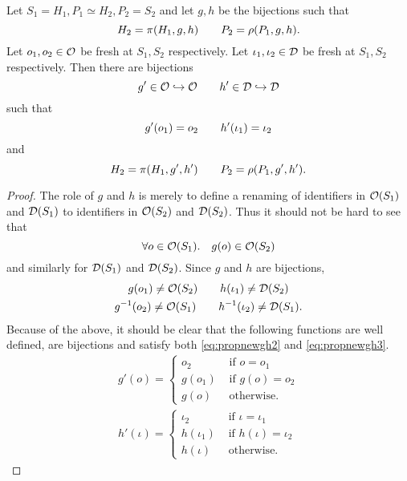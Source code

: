 \begin{proposition}
  Let $S_1 = H_1, P_1 \simeq H_2, P_2 = S_2$ and let $g, h$ be the bijections such that
  \begin{equation} \label{eq:propnewgh1}
    H_2 = \pi(H_1, g, h) \quad\quad P_2 = \rho(P_1, g, h).
  \end{equation}
  Let $o_1, o_2 \in \mathcal{O}$ be fresh at $S_1, S_2$ respectively.
  Let $\iota_1, \iota_2 \in \mathcal{D}$ be fresh at $S_1, S_2$ respectively.
  Then there are bijections
  \begin{equation*}
    g' \in \mathcal{O} \hookrightarrow \mathcal{O} \quad\quad h' \in \mathcal{D} \hookrightarrow \mathcal{D}
  \end{equation*}
  such that 
  \begin{equation} \label{eq:propnewgh2}
    g'(o_1) = o_2 \quad\quad h'(\iota_1) = \iota_2
  \end{equation} 
  and
  \begin{equation} \label{eq:propnewgh3}
    H_2 = \pi(H_1, g', h') \quad\quad P_2 = \rho(P_1, g', h').
  \end{equation}
\end{proposition}

\begin{proof}
  The role of $g$ and $h$ is merely to define a renaming of identifiers in
  $\mathcal{O}(S_1)$ and $\mathcal{D}(S_1)$ to identifiers in $\mathcal{O}(S_2)$ and $\mathcal{D}(S_2)$.
  Thus it should not be hard to see that
  \begin{equation*}
    \forall o \in \mathcal{O}(S_1). \quad g(o) \in \mathcal{O}(S_2)
  \end{equation*}
  and similarly for $\mathcal{D}(S_1)$ and $\mathcal{D}(S_2)$.
  Since $g$ and $h$ are bijections,
  \begin{equation*}
    \begin{gathered}
      g(o_1) \neq \mathcal{O}(S_2) \quad\quad h(\iota_1) \neq \mathcal{D}(S_2) \\
      g^{-1}(o_2) \neq \mathcal{O}(S_1) \quad\quad h^{-1}(\iota_2) \neq \mathcal{D}(S_1).
    \end{gathered}
  \end{equation*}
  Because of the above, it should be clear that the following functions are well
  defined, are bijections and satisfy both \eqref{eq:propnewgh2} and
  \eqref{eq:propnewgh3}.
  \begin{equation*}
    \begin{gathered}
      g'(o) =
      \begin{cases}
        o_2 & \text{ if } o = o_1 \\
        g(o_1) &\text{ if } g(o) = o_2 \\
        g(o) & \text{ otherwise.} 
      \end{cases} \\
      h'(\iota) =
      \begin{cases}
        \iota_2 & \text{ if } \iota = \iota_1 \\
        h(\iota_1) & \text{ if } h(\iota) = \iota_2 \\
        h(\iota) & \text{ otherwise.} 
      \end{cases}
    \end{gathered}
  \end{equation*}
\end{proof}

